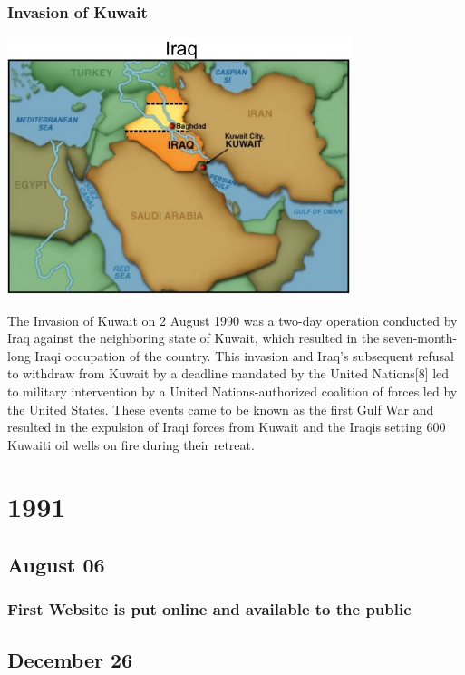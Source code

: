 \documentclass[11pt]{report}
\begin{document}
\subsection{Invasion of Kuwait}
\vspace{2mm}\begin{center}\includegraphics[width=10cm]{./img/iraqKuwaitWar.jpg}\end{center}
The Invasion of Kuwait on 2 August 1990 was a two-day operation conducted by Iraq against the neighboring state of Kuwait, which resulted in the seven-month-long Iraqi occupation of the country. This invasion and Iraq's subsequent refusal to withdraw from Kuwait by a deadline mandated by the United Nations[8] led to military intervention by a United Nations-authorized coalition of forces led by the United States. These events came to be known as the first Gulf War and resulted in the expulsion of Iraqi forces from Kuwait and the Iraqis setting 600 Kuwaiti oil wells on fire during their retreat.

\chapter{1991}
\section{August 06}
\subsection{First Website is put online and available to the public}

\section{December 26}
\end{document}
